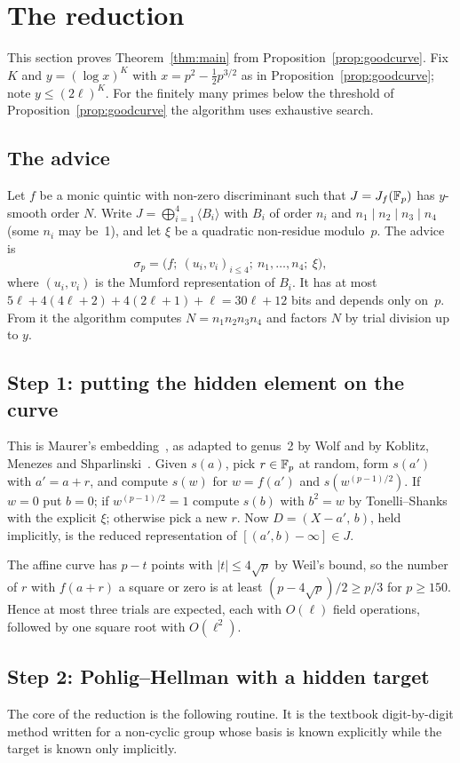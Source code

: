 \section{The reduction}\label{sec:reduction}

This section proves Theorem~\ref{thm:main} from Proposition~\ref{prop:goodcurve}. Fix $K$ and
$y=(\log x)^K$ with $x=p^2-\tfrac12p^{3/2}$ as in Proposition~\ref{prop:goodcurve}; note
$y\le(2\ell)^K$. For the finitely many primes below the threshold of Proposition~\ref{prop:goodcurve} the
algorithm uses exhaustive search.

\subsection{The advice}
Let $f$ be a monic quintic with non-zero discriminant such that $J=J_f(\mathbb{F}_p)$ has $y$-smooth order $N$. Write
$J=\bigoplus_{i=1}^4\langle B_i\rangle$ with $B_i$ of order $n_i$ and $n_1\mid n_2\mid n_3\mid n_4$ (some
$n_i$ may be~1), and let $\xi$ be a quadratic non-residue modulo~$p$. The advice is
\[
\sigma_p=\bigl(f;\ (u_i,v_i)_{i\le4};\ n_1,\dots,n_4;\ \xi\bigr),
\]
where $(u_i,v_i)$ is the Mumford representation of $B_i$. It has at most
$5\ell+4(4\ell+2)+4(2\ell+1)+\ell=30\ell+12$ bits and depends only on~$p$. From it the algorithm computes
$N=n_1n_2n_3n_4$ and factors $N$ by trial division up to $y$.

\subsection{Step 1: putting the hidden element on the curve}
This is Maurer's embedding~\cite{Mau94}, as adapted to genus~2 by Wolf and by Koblitz, Menezes and
Shparlinski~\cite{Wol99,KMS10}. Given $s(a)$, pick $r\in\mathbb{F}_p$ at random, form $s(a')$ with $a'=a+r$, and
compute $s(w)$ for $w=f(a')$ and $s(w^{(p-1)/2})$. If $w=0$ put $b=0$; if $w^{(p-1)/2}=1$ compute $s(b)$ with
$b^2=w$ by Tonelli--Shanks with the explicit $\xi$; otherwise pick a new $r$. Now $D=(X-a',\,b)$, held
implicitly, is the reduced representation of $[(a',b)-\infty]\in J$.

The affine curve has $p-t$ points with $|t|\le4\sqrt p$ by Weil's bound, so the number of $r$ with
$f(a+r)$ a square or zero is at least $(p-4\sqrt p)/2\ge p/3$ for $p\ge150$. Hence at most three trials are
expected, each with $O(\ell)$ field operations, followed by one square root with $O(\ell^2)$.

\subsection{Step 2: Pohlig--Hellman with a hidden target}
The core of the reduction is the following routine. It is the textbook digit-by-digit method written for a
non-cyclic group whose basis is known explicitly while the target is known only implicitly.

